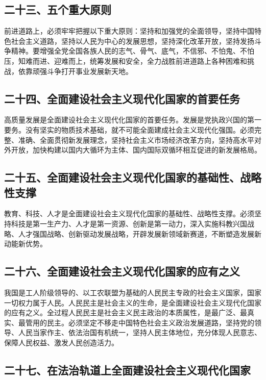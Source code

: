 \documentclass[UTF8,11pt,a4paper]{ctexart}
\begin{document}
\subsection*{二十三、五个重大原则}

前进道路上，必须牢牢把握以下重大原则：坚持和加强党的全面领导，坚持中国特色社会主义道路，坚持以人民为中心的发展思想，坚持深化改革开放，坚持发扬斗争精神。要增强全党全国各族人民的志气、骨气、底气，不信邪、不怕鬼、不怕压，知难而进、迎难而上，统筹发展和安全，全力战胜前进道路上各种困难和挑战，依靠顽强斗争打开事业发展新天地。

\subsection*{二十四、全面建设社会主义现代化国家的首要任务}

高质量发展是全面建设社会主义现代化国家的首要任务。发展是党执政兴国的第一要务。没有坚实的物质技术基础，就不可能全面建成社会主义现代化强国。必须完整、准确、全面贯彻新发展理念，坚持社会主义市场经济改革方向，坚持高水平对外开放，加快构建以国内大循环为主体、国内国际双循环相互促进的新发展格局。

\subsection*{二十五、全面建设社会主义现代化国家的基础性、战略性支撑}

教育、科技、人才是全面建设社会主义现代化国家的基础性、战略性支撑。必须坚持科技是第一生产力、人才是第一资源、创新是第一动力，深入实施科教兴国战略、人才强国战略、创新驱动发展战略，开辟发展新领域新赛道，不断塑造发展新动能新优势。

\subsection*{二十六、全面建设社会主义现代化国家的应有之义}

我国是工人阶级领导的、以工农联盟为基础的人民民主专政的社会主义国家，国家一切权力属于人民。人民民主是社会主义的生命，是全面建设社会主义现代化国家的应有之义。全过程人民民主是社会主义民主政治的本质属性，是最广泛、最真实、最管用的民主。必须坚定不移走中国特色社会主义政治发展道路，坚持党的领导、人民当家作主、依法治国有机统一，坚持人民主体地位，充分体现人民意志、保障人民权益、激发人民创造活力。

\subsection*{二十七、在法治轨道上全面建设社会主义现代化国家}
\end{document}
